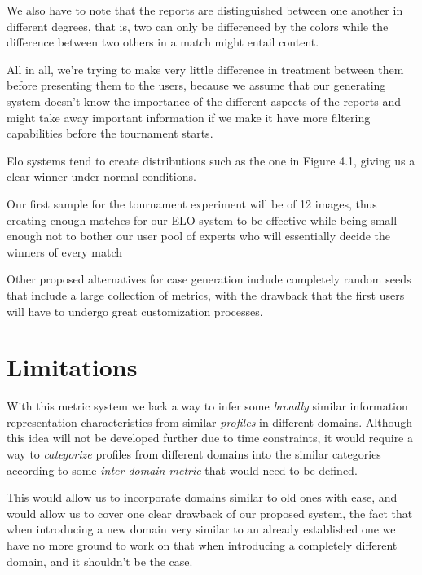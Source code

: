 We also have to note that the reports are distinguished between one another in different degrees, that is, two can only be differenced by the colors while the difference between two others in a match might entail content.

All in all, we're trying to make very little difference in treatment between them before presenting them to the users, because we assume that our generating system doesn't know the importance of the different aspects of the reports and might take away important information if we make it have more filtering capabilities before the tournament starts.


Elo systems tend to create distributions such as the one in Figure 4.1, giving us a clear winner under normal conditions.

Our first sample for the tournament experiment will be of 12 images, thus creating enough matches for our ELO system to be effective while being small enough not to bother our user pool of experts who will essentially decide the winners of every match

Other proposed alternatives for case generation include completely random seeds that include a large collection of metrics, with the drawback that the first users will have to undergo great customization processes.

\section{Limitations}
\label{cap4:sec:limitations}
With this metric system we lack a way to infer some \textit{broadly} similar information representation characteristics from similar \textit{profiles} in different domains.
Although this idea will not be developed further due to time constraints, it would require a way to \textit{categorize} profiles from different domains into the similar categories according to some \textit{inter-domain metric} that would need to be defined.

This would allow us to incorporate domains similar to old ones with ease, and would allow us to cover one clear drawback of our proposed system, the fact that when introducing a new domain very similar to an already established one we have no more ground to work on that when introducing a completely different domain, and it shouldn't be the case.

